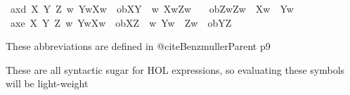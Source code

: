 \begin{isabellebody}
\isanewline
{}\ ax{\isacharunderscore}{}d{\isacharcolon}\ {\isachardoublequoteopen}{\isasymforall}X\ Y\ Z{\isachardot}\ {\isacharparenleft}{\isacharparenleft}{\isasymforall}w{\isachardot}\ Y{\isacharparenleft}w{\isacharparenright}{\isasymlongrightarrow}X{\isacharparenleft}w{\isacharparenright}{\isacharparenright}\ {\isasymand}\ ob{\isacharparenleft}X{\isacharparenright}{\isacharparenleft}Y{\isacharparenright}\ {\isasymand}\ {\isacharparenleft}{\isasymforall}w{\isachardot}\ X{\isacharparenleft}w{\isacharparenright}{\isasymlongrightarrow}Z{\isacharparenleft}w{\isacharparenright}{\isacharparenright}{\isacharparenright}\ \isanewline
\ \ {\isasymlongrightarrow}ob{\isacharparenleft}Z{\isacharparenright}{\isacharparenleft}{\isasymlambda}w{\isachardot}{\isacharparenleft}Z{\isacharparenleft}w{\isacharparenright}\ {\isasymand}\ {\isasymnot}X{\isacharparenleft}w{\isacharparenright}{\isacharparenright}\ {\isasymor}\ Y{\isacharparenleft}w{\isacharparenright}{\isacharparenright}{\isachardoublequoteclose}\isanewline
%
\isanewline
\isanewline
{}\ ax{\isacharunderscore}{}e{\isacharcolon}\ {\isachardoublequoteopen}{\isasymforall}X\ Y\ Z{\isachardot}\ {\isacharparenleft}{\isacharparenleft}{\isasymforall}w{\isachardot}\ Y{\isacharparenleft}w{\isacharparenright}{\isasymlongrightarrow}X{\isacharparenleft}w{\isacharparenright}{\isacharparenright}\ {\isasymand}\ ob{\isacharparenleft}X{\isacharparenright}{\isacharparenleft}Z{\isacharparenright}\ {\isasymand}\ {\isacharparenleft}{\isasymexists}w{\isachardot}\ Y{\isacharparenleft}w{\isacharparenright}\ {\isasymand}\ Z{\isacharparenleft}w{\isacharparenright}{\isacharparenright}{\isacharparenright}\ {\isasymlongrightarrow}\ ob{\isacharparenleft}Y{\isacharparenright}{\isacharparenleft}Z{\isacharparenright}{\isachardoublequoteclose}\isanewline
%
%
\isadelimdocument
%
\endisadelimdocument
%
\isatagdocument
%
\isamarkuptrue%
%
\endisatagdocument
{\isafolddocument}%
%
\isadelimdocument
%
\endisadelimdocument
%
\begin{isamarkuptext}%
These abbreviations are defined in @cite{BenzmullerParent} p9%
\end{isamarkuptext}\isamarkuptrue%
%
\begin{isamarkuptext}%
These are all syntactic sugar for HOL expressions, so evaluating these symbols will be light-weight%

\end{isamarkuptext}
\end{isabellebody}
